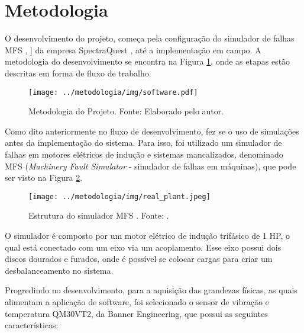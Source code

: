 \documentclass[a4paper]{ifacconf}
\begin{document}

\section{Metodologia}

O desenvolvimento do projeto, começa pela configuração do simulador de falhas MFS \textsuperscript \textregistered, ]
da empresa SpectraQuest \textsuperscript \textregistered, até a implementação em campo. A metodologia do desenvolvimento se encontra na
Figura \ref{fig:metodologia}, onde as etapas estão descritas em forma de fluxo de trabalho.

\begin{figure}[H]
  \begin{center}
      \texttt{[image: ../metodologia/img/software.pdf]}
      \caption{Metodologia do Projeto. Fonte: Elaborado pelo autor.}
  \end{center} 
  \label{fig:metodologia}
\end{figure}

Como dito anteriormente no fluxo de desenvolvimento, fez se o uso de simulações antes da implementação do sistema.
Para isso, foi utilizado um simulador de falhas em motores elétricos de indução e sistemas mancalizados, denominado
MFS \textsuperscript \textregistered (\textit{Machinery Fault Simulator} - simulador de falhas em máquinas), que pode ser visto na Figura 
\ref{fig:real_plant}.

\begin{figure}[H]
    \begin{center}
        \texttt{[image: ../metodologia/img/real\_plant.jpeg]}
    \end{center}
    \caption{Estrutura do simulador MFS \textsuperscript \textregistered. Fonte: \cite{SpectraQuest2011}.}
    \label{fig:real_plant}
\end{figure}

O simulador é composto por um motor elétrico de indução trifásico de 1 HP, o qual está conectado com um eixo via um 
acoplamento. Esse eixo possui dois discos dourados e furados, onde é possível se colocar cargas para criar um desbalanceamento no sistema.

Progredindo no desenvolvimento, para a aquisição das grandezas físicas, as quais alimentam a aplicação de software, foi selecionado o sensor 
de vibração e temperatura QM30VT2, da Banner Engineering, que possui as seguintes características:
\end{document}
